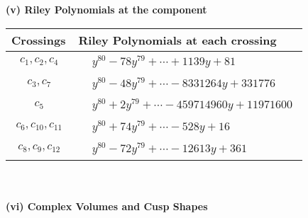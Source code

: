\documentclass[1p]{elsarticle_modified}
\theoremstyle{definition}
\begin{document}
\newpage\renewcommand{\arraystretch}{1}
\flushleft \textbf{(v) Riley Polynomials at the component}\newline \\
\begin{tabular}{m{50pt}|m{274pt}}
Crossings & \hspace{64pt}Riley Polynomials at each crossing \\
\hline $$\begin{aligned}c_{1},c_{2},c_{4}\end{aligned}$$&$\begin{aligned}
&y^{80}-78 y^{79}+\cdots+1139 y+81
\end{aligned}$\\
\hline $$\begin{aligned}c_{3},c_{7}\end{aligned}$$&$\begin{aligned}
&y^{80}-48 y^{79}+\cdots-8331264 y+331776
\end{aligned}$\\
\hline $$\begin{aligned}c_{5}\end{aligned}$$&$\begin{aligned}
&y^{80}+2 y^{79}+\cdots-459714960 y+11971600
\end{aligned}$\\
\hline $$\begin{aligned}c_{6},c_{10},c_{11}\end{aligned}$$&$\begin{aligned}
&y^{80}+74 y^{79}+\cdots-528 y+16
\end{aligned}$\\
\hline $$\begin{aligned}c_{8},c_{9},c_{12}\end{aligned}$$&$\begin{aligned}
&y^{80}-72 y^{79}+\cdots-12613 y+361
\end{aligned}$\\
\hline
\end{tabular}\\~\\
\newpage\flushleft \textbf{(vi) Complex Volumes and Cusp Shapes}
\end{document}
